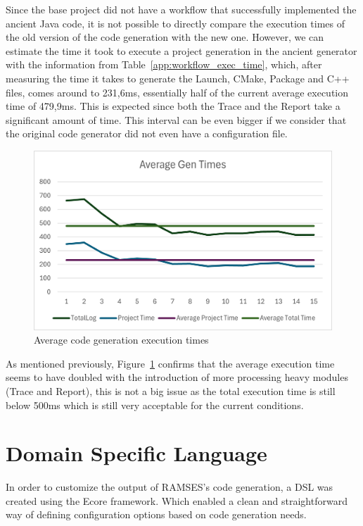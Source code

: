 Since the base project did not have a workflow that successfully implemented the ancient Java code, it is not possible to directly compare the execution times of the old version of the code generation with the new one. However, we can estimate the time it took to execute a project generation in the ancient generator with the information from Table~\ref{app:workflow_exec_time}, which, after measuring the time it takes to generate the Launch, CMake, Package and C++ files, comes around to 231,6ms, essentially half of the current average execution time of 479,9ms. This is expected since both the Trace and the Report take a significant amount of time. This interval can be even bigger if we consider that the original code generator did not even have a configuration file.

\begin{figure}[htbp]
	\centering
	\includegraphics[width=\textwidth]{avg_exec_times_1.png}
	\caption{Average code generation execution times}
	\label{fig:avg_exec_times_1}
\end{figure}

As mentioned previously, Figure~\ref{fig:avg_exec_times_1} confirms that the average execution time seems to have doubled with the introduction of more processing heavy modules (Trace and Report), this is not a big issue as the total execution time is still below 500ms which is still very acceptable for the current conditions.




\section{Domain Specific Language}
\label{sec:dsl}

In order to customize the output of \gls{RAMSES}'s code generation, a \gls{DSL} was created using the Ecore framework. Which enabled a clean and straightforward way of defining configuration options based on code generation needs.

